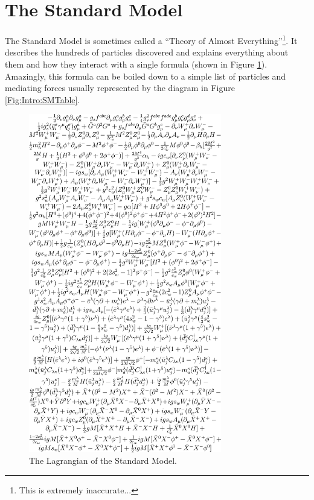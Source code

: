 \section{The Standard Model}
The Standard Model is sometimes called a ``Theory of Almost Everything''\footnote{This is extremely inaccurate...}. It describes the hundreds of particles discovered and explains everything about them and how they interact with a single formula (shown in Figure \ref{Fig:Intro:SML}). Amazingly, this formula can be boiled down to a simple list of particles and mediating forces usually represented by the diagram in Figure \ref{Fig:Intro:SMTable}.
\begin{figure}[h]
    \centering
        \includegraphics[width=0.75\textwidth]{F1/StandardModelEquation}
        \caption{The Lagrangian of the Standard Model.}
        \label{Fig:Intro:SML}
\end{figure}

